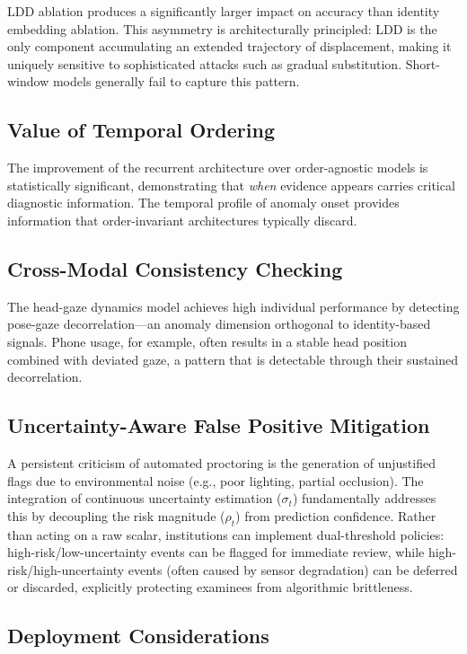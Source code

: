 \documentclass[journal]{IEEEtran}
\begin{document}
LDD ablation produces a significantly larger impact on accuracy than identity embedding ablation. This asymmetry is architecturally principled: LDD is the only component accumulating an extended trajectory of displacement, making it uniquely sensitive to sophisticated attacks such as gradual substitution. Short-window models generally fail to capture this pattern.

\subsection{Value of Temporal Ordering}

The improvement of the recurrent architecture over order-agnostic models is statistically significant, demonstrating that \emph{when} evidence appears carries critical diagnostic information. The temporal profile of anomaly onset provides information that order-invariant architectures typically discard.

\subsection{Cross-Modal Consistency Checking}

The head-gaze dynamics model achieves high individual performance by detecting pose-gaze decorrelation—an anomaly dimension orthogonal to identity-based signals. Phone usage, for example, often results in a stable head position combined with deviated gaze, a pattern that is detectable through their sustained decorrelation.

\subsection{Uncertainty-Aware False Positive Mitigation}

A persistent criticism of automated proctoring is the generation of unjustified flags due to environmental noise (e.g., poor lighting, partial occlusion). The integration of continuous uncertainty estimation ($\sigma_t$) fundamentally addresses this by decoupling the risk magnitude ($\rho_t$) from prediction confidence. Rather than acting on a raw scalar, institutions can implement dual-threshold policies: high-risk/low-uncertainty events can be flagged for immediate review, while high-risk/high-uncertainty events (often caused by sensor degradation) can be deferred or discarded, explicitly protecting examinees from algorithmic brittleness.

\subsection{Deployment Considerations}
\end{document}
